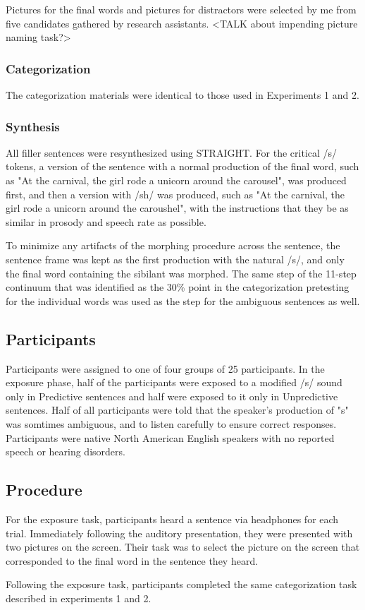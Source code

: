 Pictures for the final words and pictures for distractors were selected by me from five candidates gathered by research assistants.  <TALK about impending picture naming task?>


\subsubsection{Categorization}

The categorization materials were identical to those used in Experiments 1 and 2.
	

\subsubsection{Synthesis}

All filler sentences were resynthesized using STRAIGHT.  For the critical /s/ tokens, a version of the sentence with a normal production of the final word, such as "At the carnival, the girl rode a unicorn around the carousel", was produced first, and then a version with /sh/ was produced, such as "At the carnival, the girl rode a unicorn around the caroushel", with the instructions that they be as similar in prosody and speech rate as possible.

To minimize any artifacts of the morphing procedure across the sentence, the sentence frame was kept as the first production with the natural /s/, and only the final word containing the sibilant was morphed.  The same step of the 11-step continuum that was identified as the 30\% point in the categorization pretesting for the individual words was used as the step for the ambiguous sentences as well.

\subsection{Participants}

Participants were assigned to one of four groups of 25 participants.  In the exposure phase, half of the participants were exposed to a modified /s/ sound only in Predictive sentences and half were exposed to it only in Unpredictive sentences.  Half of all participants were told that the speaker's production of "s" was somtimes ambiguous, and to listen carefully to ensure correct responses.  Participants were native North American English speakers with no reported speech or hearing disorders.

\subsection{Procedure}

For the exposure task, participants heard a sentence via headphones for each trial.  Immediately following the auditory presentation, they were presented with two pictures on the screen.  Their task was to select the picture on the screen that corresponded to the final word in the sentence they heard.

Following the exposure task, participants completed the same categorization task described in experiments 1 and 2.


